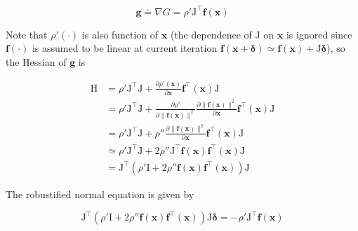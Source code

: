 \begin{equation}
    \bm{g} \doteq \nabla G = \rho' \mathrm{J}^\top \bm{f}(\bm{x})
\end{equation}

Note that $\rho'(\cdot)$ is also function of $\bm{x}$ (the dependence of $\mathrm{J}$ on $\bm{x}$ is ignored since $\bm{f}(\cdot)$ is assumed to be linear at current iteration $\bm{f}(\bm{x} + \bm{\delta}) \simeq \bm{f}(\bm{x}) + \mathrm{J}\bm{\delta}$), so the Hessian of $\bm{g}$ is

\begin{equation}
\begin{aligned}
    \mathrm{H}
           &=
              \rho' \mathrm{J}^\top \mathrm{J} +
              \frac{\partial\rho'(\bm{x})}{\partial\bm{x}}
              \bm{f}^\top(\bm{x})\mathrm{J} \\
           &=
              \rho' \mathrm{J}^\top \mathrm{J} +
              \frac{\partial\rho'}{\partial\lVert\bm{f}(\bm{x})\rVert^2}
              \frac{\partial\lVert\bm{f}(\bm{x})\rVert^2}{\partial\bm{x}}
              \bm{f}^\top(\bm{x}) \mathrm{J} \\
           &=
              \rho' \mathrm{J}^\top \mathrm{J} + \rho''
              \frac{\partial\lVert\bm{f}(\bm{x})\rVert^2}{\partial\bm{x}}
              \bm{f}^\top(\bm{x}) \mathrm{J} \\
           &\simeq
              \rho' \mathrm{J}^\top \mathrm{J} + 2\rho''
              \mathrm{J}^\top \bm{f}(\bm{x}) \bm{f}^\top(\bm{x}) \mathrm{J} \\
           &=
              \mathrm{J}^\top \left(
                  \rho'\mathrm{I} + 2\rho''
                  \bm{f}(\bm{x}) \bm{f}^\top(\bm{x})
              \right) \mathrm{J}
\end{aligned}
\end{equation}

The robustified normal equation is given by

\begin{equation}
    \mathrm{J}^\top \left(
        \rho'\mathrm{I} + 2\rho''
        \bm{f}(\bm{x}) \bm{f}^\top(\bm{x})
    \right) \mathrm{J} \bm{\delta}
    =
    -\rho' \mathrm{J}^\top \bm{f}(\bm{x})
\end{equation}
